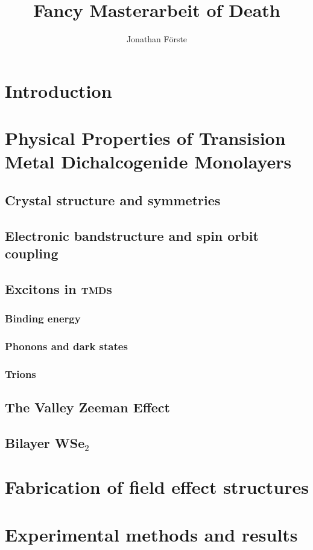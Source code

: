 \documentclass{scrbook}
\title{Fancy Masterarbeit of Death}
\author{Jonathan Förste}
\begin{document}
\maketitle
\tableofcontents
\chapter{Introduction}
\chapter{Physical Properties of Transision Metal Dichalcogenide Monolayers}
	\section{Crystal structure and symmetries}
	\section{Electronic bandstructure and spin orbit coupling}
	\section{Excitons in \textsc{tmd}s}
		\subsection{Binding energy}
		\subsection{Phonons and dark states}
		\subsection{Trions}
	\section{The Valley Zeeman Effect}
	\section{Bilayer WSe$_2$}
\chapter{Fabrication of field effect structures}
	
\chapter{Experimental methods and results}
\end{document}
